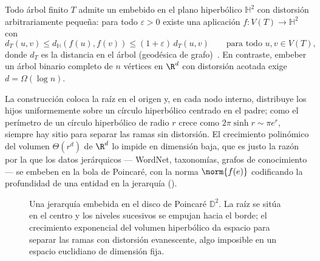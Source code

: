 \begin{theorem}
\label{thm:geo:tree-embedding}
Todo \'arbol finito $T$ admite un embebido en el plano hiperb\'olico
$\mathbb{H}^2$ con distorsi\'on arbitrariamente peque\~na: para todo
$\varepsilon > 0$ existe una aplicaci\'on $f \colon V(T) \to \mathbb{H}^2$ con
\[
  d_T(u,v) \le d_{\mathbb{H}}(f(u), f(v)) \le (1+\varepsilon)\, d_T(u,v)
  \qquad \text{para todo } u, v \in V(T),
\]
donde $d_T$ es la distancia en el \'arbol (geod\'esica de grafo)~\citep{sarkar2011low}.
En contraste, embeber un \'arbol binario completo de $n$ v\'ertices en $\R^d$ con
distorsi\'on acotada exige $d = \Omega(\log n)$.
\end{theorem}

La construcci\'on coloca la ra\'iz en el origen y, en cada nodo interno,
distribuye los hijos uniformemente sobre un c\'irculo hiperb\'olico centrado en
el padre; como el per\'imetro de un c\'irculo hiperb\'olico de radio $r$ crece
como $2\pi\sinh r \sim \pi e^r$, siempre hay sitio para separar las ramas sin
distorsi\'on. El crecimiento polin\'omico del volumen $\Theta(r^d)$ de $\R^d$ lo
impide en dimensi\'on baja, que es justo la raz\'on por la que los datos
jer\'arquicos --- WordNet, taxonom\'ias, grafos de conocimiento --- se embeben en
la bola de Poincar\'e, con la norma $\norm{f(e)}$ codificando la profundidad de
una entidad en la jerarqu\'ia ().

\begin{figure}[h]
\centering
{}
\caption[Embebido hiperb\'olico de \'arboles]{Una jerarqu\'ia embebida en el
disco de Poincar\'e $\mathbb{D}^2$. La ra\'iz se sit\'ua en el centro y los
niveles sucesivos se empujan hacia el borde; el crecimiento exponencial del
volumen hiperb\'olico da espacio para separar las ramas con distorsi\'on
evanescente, algo imposible en un espacio euclidiano de dimensi\'on fija.}
\label{fig:geo:hyperbolic}
\end{figure}


